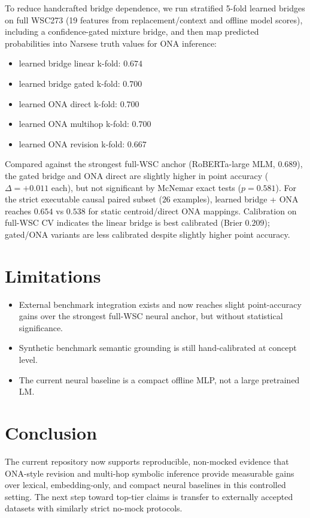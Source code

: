 \documentclass{article}
\begin{document}
To reduce handcrafted bridge dependence, we run stratified 5-fold learned bridges on full WSC273 (19 features from replacement/context and offline model scores), including a confidence-gated mixture bridge, and then map predicted probabilities into Narsese truth values for ONA inference:
\begin{itemize}
    \item learned bridge linear k-fold: \(0.674\)
    \item learned bridge gated k-fold: \(0.700\)
    \item learned ONA direct k-fold: \(0.700\)
    \item learned ONA multihop k-fold: \(0.700\)
    \item learned ONA revision k-fold: \(0.667\)
\end{itemize}
Compared against the strongest full-WSC anchor (RoBERTa-large MLM, \(0.689\)), the gated bridge and ONA direct are slightly higher in point accuracy (\(\Delta=+0.011\) each), but not significant by McNemar exact tests (\(p=0.581\)). For the strict executable causal paired subset (\(26\) examples), learned bridge + ONA reaches \(0.654\) vs \(0.538\) for static centroid/direct ONA mappings.
Calibration on full-WSC CV indicates the linear bridge is best calibrated (Brier \(0.209\)); gated/ONA variants are less calibrated despite slightly higher point accuracy.

\section{Limitations}
\begin{itemize}
    \item External benchmark integration exists and now reaches slight point-accuracy gains over the strongest full-WSC neural anchor, but without statistical significance.
    \item Synthetic benchmark semantic grounding is still hand-calibrated at concept level.
    \item The current neural baseline is a compact offline MLP, not a large pretrained LM.
\end{itemize}

\section{Conclusion}
The current repository now supports reproducible, non-mocked evidence that ONA-style revision and multi-hop symbolic inference provide measurable gains over lexical, embedding-only, and compact neural baselines in this controlled setting. The next step toward top-tier claims is transfer to externally accepted datasets with similarly strict no-mock protocols.
\end{document}

